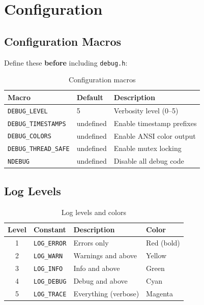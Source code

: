 \documentclass[11pt,a4paper]{article}
\begin{document}
\section{Configuration}

\subsection{Configuration Macros}

Define these \textbf{before} including \texttt{debug.h}:

\begin{table}[h]
\centering
\begin{tabular}{@{}lll@{}}
\toprule
\textbf{Macro} & \textbf{Default} & \textbf{Description} \\
\midrule
\texttt{DEBUG\_LEVEL} & 5 & Verbosity level (0--5) \\
\texttt{DEBUG\_TIMESTAMPS} & undefined & Enable timestamp prefixes \\
\texttt{DEBUG\_COLORS} & undefined & Enable ANSI color output \\
\texttt{DEBUG\_THREAD\_SAFE} & undefined & Enable mutex locking \\
\texttt{NDEBUG} & undefined & Disable all debug code \\
\bottomrule
\end{tabular}
\caption{Configuration macros}
\end{table}

\subsection{Log Levels}

\begin{table}[h]
\centering
\begin{tabular}{@{}clll@{}}
\toprule
\textbf{Level} & \textbf{Constant} & \textbf{Description} & \textbf{Color} \\
\midrule
1 & \texttt{LOG\_ERROR} & Errors only & \textcolor{errorred}{Red (bold)} \\
2 & \texttt{LOG\_WARN} & Warnings and above & \textcolor{warnyellow}{Yellow} \\
3 & \texttt{LOG\_INFO} & Info and above & \textcolor{infogreen}{Green} \\
4 & \texttt{LOG\_DEBUG} & Debug and above & \textcolor{debugcyan}{Cyan} \\
5 & \texttt{LOG\_TRACE} & Everything (verbose) & \textcolor{tracemagenta}{Magenta} \\
\bottomrule
\end{tabular}
\caption{Log levels and colors}
\end{table}
\end{document}
